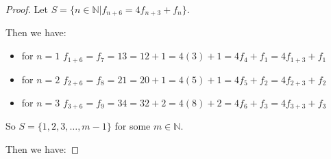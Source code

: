 \documentclass[12pt,letterpaper]{article}
\begin{document}
\begin{enumerate}
\begin{enumerate}
\begin{enumerate}
\begin{proof}
                Let $S = \{n \in \mathbb{N} | f_{n + 6} = 4f_{n + 3} + f_n\}$.

                Then we have:

                \begin{itemize}
                  \item for $n = 1$ \quad $f_{1 + 6} = f_7 = 13 = 12 + 1 = 4(3) + 1 = 4f_4 + f_1 = 4f_{1 + 3} + f_1$
                  \item for $n = 2$ \quad $f_{2 + 6} = f_8 = 21 = 20 + 1 = 4(5) + 1 = 4f_5 + f_2 = 4f_{2 + 3} + f_2$
                  \item for $n = 3$ \quad $f_{3 + 6} = f_9 = 34 = 32 + 2 = 4(8) + 2 = 4f_6 + f_3 = 4f_{3 + 3} + f_3$
                \end{itemize}

                So $S = \{1, 2, 3, \dots, m - 1\}$ for some $m \in \mathbb{N}$.

                Then we have:


\end{proof}
\end{enumerate}
\end{enumerate}
\end{enumerate}
\end{document}
